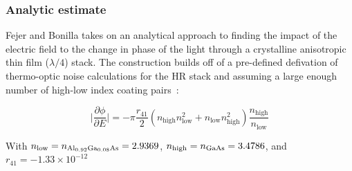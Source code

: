 %


\subsubsection*{Analytic estimate}
Fejer and Bonilla takes on an analytical approach to finding the impact of the electric field to the change in phase of the light through a crystalline anisotropic thin film ($\lambda/4$) stack. The construction builds off of a pre-defined defivation of thermo-optic noise calculations for the HR stack and assuming a large enough number of high-low index coating pairs~\cite{bonillafejer, fejer_estimate}:

\begin{equation}
    \bigg| \frac{\partial \phi}{\partial E} \bigg| = - \pi \frac{r_{41}}{2}(n_\mathrm{high} n_\mathrm{low} ^2 + n_\mathrm{low} n_\mathrm{high} ^2) \frac{n_\mathrm{high}}{n_\mathrm{low}}
\end{equation}

With $n_\mathrm{low} = n_{\mathrm{Al_{0.92}Ga_{0.08}As}} = 2.9369$, $n_\mathrm{high} = n_{\mathrm{GaAs}} = 3.4786$, and $r_{41} = -1.33 \times 10^{-12}$

